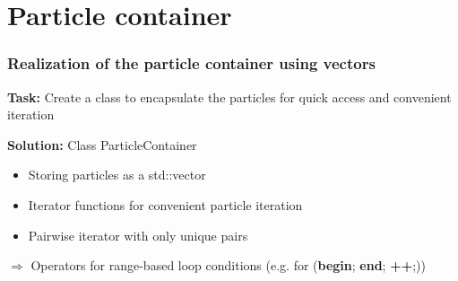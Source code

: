 \section{Particle container}

\begin{frame}
    \frametitle{Realization of the particle container using vectors}
    \textbf{Task:} Create a class to encapsulate the particles for quick access and convenient iteration

    \textbf{Solution:} Class ParticleContainer

    \begin{itemize}
        \item Storing particles as a std::vector
        \item Iterator functions for convenient particle iteration
        \item Pairwise iterator with only unique pairs
    \end{itemize}
    $\Rightarrow$ Operators for range-based loop conditions (e.g. for (\textbf{begin}; \textbf{end}; \textbf{++};))
\end{frame}